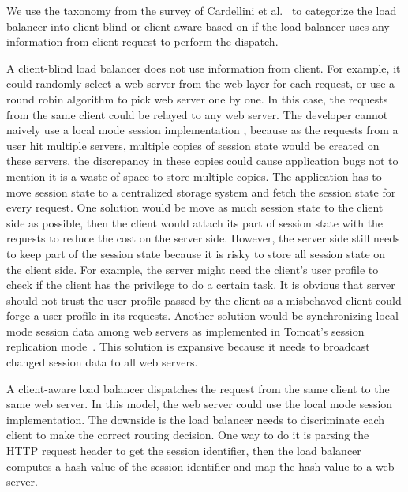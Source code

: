 We use the taxonomy from the survey of Cardellini et al.~\cite{cardellini2002state}
to categorize the load balancer into client-blind or client-aware based on if
the load balancer uses any information from client request to perform the dispatch.

A client-blind load balancer does not use information from client.
For example, it could randomly select a web server from the web layer for each request,
or use a round robin algorithm to pick web server one by one.
In this case, the requests from the same client could be relayed to any web server.
The developer cannot naively use a local mode session implementation
, because as the requests from a user hit multiple servers,
multiple copies of session state would be created on these servers,
the discrepancy in these copies could cause application bugs not to mention
it is a waste of space to store multiple copies.
The application has to move session state to a centralized
storage system and fetch the session state for every request.
One solution would be move as much session state to the client side as possible,
then the client would attach its part of session state
with the requests to reduce the cost on the server side.
However, the server side still needs to keep part of the session state
because it is risky to store all session state on
the client side.
For example,
the server might need the client's user profile to check if the client has
the privilege to do a certain task.
It is obvious that server should not trust the user profile passed by the client
as a misbehaved client could forge a user profile in its requests.
Another solution would be synchronizing local mode session data among web servers
as implemented in Tomcat's session replication mode~\cite{tomcatcluster}. %
This solution is expansive because it needs to broadcast
changed session data to all web servers.

A client-aware load balancer dispatches the request from the same
client to the same web server.
In this model, the web server could use the local mode session implementation.
The downside is the load balancer needs to discriminate each client
to make the correct routing decision.
One way to do it is parsing the HTTP request header to get
the session identifier,
then the load balancer computes a hash value of
the session identifier and map the hash value to a web server.


